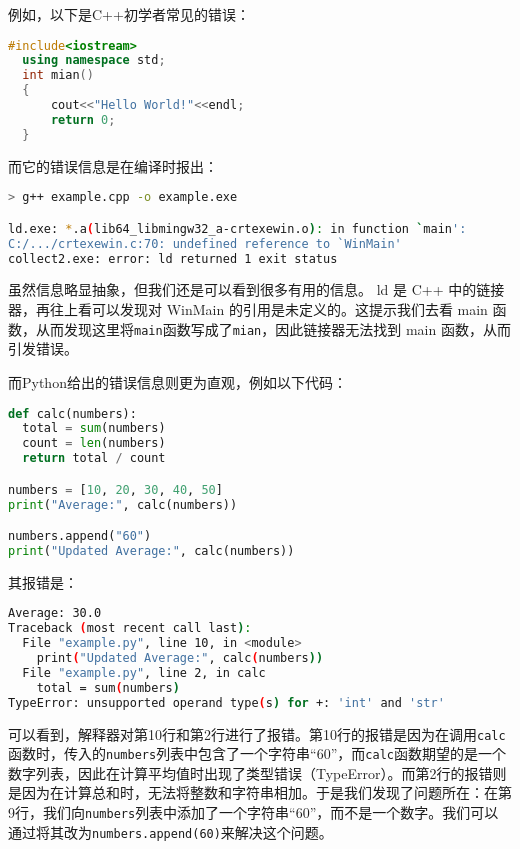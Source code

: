 \documentclass[../main.tex]{subfiles}
\begin{document}
例如，以下是C++初学者常见的错误：

\begin{lstlisting}[language=C++]
  #include<iostream>
  using namespace std;
  int mian()
  {
      cout<<"Hello World!"<<endl;
      return 0;
  }
\end{lstlisting}

而它的错误信息是在编译时报出：

\begin{lstlisting}[language=bash]
> g++ example.cpp -o example.exe

ld.exe: *.a(lib64_libmingw32_a-crtexewin.o): in function `main':
C:/.../crtexewin.c:70: undefined reference to `WinMain'
collect2.exe: error: ld returned 1 exit status
\end{lstlisting}

虽然信息略显抽象，但我们还是可以看到很多有用的信息。 ld 是 C++ 中的链接器，再往上看可以发现对 WinMain 的引用是未定义的。这提示我们去看 main 函数，从而发现这里将\texttt{main}函数写成了\texttt{mian}，因此链接器无法找到 main 函数，从而引发错误。

而Python给出的错误信息则更为直观，例如以下代码：

\begin{lstlisting}[language=Python]
def calc(numbers):
  total = sum(numbers)
  count = len(numbers)
  return total / count

numbers = [10, 20, 30, 40, 50]
print("Average:", calc(numbers))

numbers.append("60")
print("Updated Average:", calc(numbers))
\end{lstlisting}

其报错是：
\begin{lstlisting}[language=bash]
Average: 30.0
Traceback (most recent call last):
  File "example.py", line 10, in <module>
    print("Updated Average:", calc(numbers))
  File "example.py", line 2, in calc
    total = sum(numbers)
TypeError: unsupported operand type(s) for +: 'int' and 'str'
\end{lstlisting}

可以看到，解释器对第10行和第2行进行了报错。第10行的报错是因为在调用\texttt{calc}函数时，传入的\texttt{numbers}列表中包含了一个字符串“60”，而\texttt{calc}函数期望的是一个数字列表，因此在计算平均值时出现了类型错误（TypeError）。而第2行的报错则是因为在计算总和时，无法将整数和字符串相加。于是我们发现了问题所在：在第9行，我们向\texttt{numbers}列表中添加了一个字符串“60”，而不是一个数字。我们可以通过将其改为\texttt{numbers.append(60)}来解决这个问题。
\end{document}
